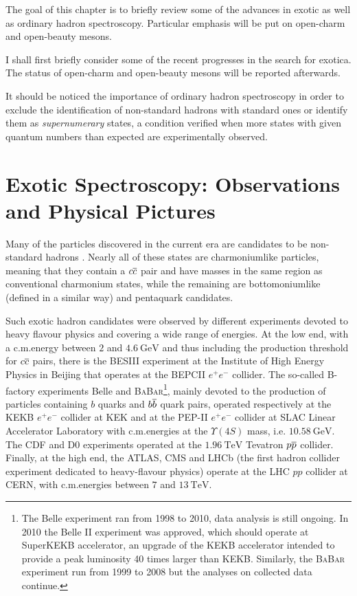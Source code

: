 The goal of this chapter is to briefly review some of the advances in exotic as well as ordinary hadron spectroscopy. Particular emphasis will be put on open-charm and open-beauty mesons.

I shall first briefly consider some of the recent progresses in the search for exotica. The status of open-charm and open-beauty mesons will be reported afterwards.

It should be noticed the importance of ordinary hadron spectroscopy in order to exclude the identification of non-standard hadrons with standard ones or identify them as \emph{supernumerary} states, a condition verified when more states with given quantum numbers than expected are experimentally observed.

\section{Exotic Spectroscopy: Observations and Physical Pictures}

Many of the particles discovered in the current era are candidates to be non-standard hadrons \cite{Lebed:2016hpi, Olsen:2017bmm}. Nearly all of these states are charmoniumlike particles, meaning that they contain a $c \overline{c}$ pair and have masses in the same region as conventional charmonium states, while the remaining are bottomoniumlike (defined in a similar way) and pentaquark candidates. 

Such exotic hadron candidates were observed by different experiments devoted to heavy flavour physics and covering a wide range of energies. At the low end, with a c.m.\@ energy between $2$ and $4.6 \ \text{GeV}$ and thus including the production threshold for $c \overline{c}$ pairs, there is the BESIII experiment at the Institute of High Energy Physics in Beijing that operates at the BEPCII $e^+ e^-$ collider. The so-called B-factory experiments Belle and \textsc{BaBar}\footnote{The Belle experiment ran from 1998 to 2010, data analysis is still ongoing. In 2010 the Belle II experiment was approved, which should operate at SuperKEKB accelerator, an upgrade of the KEKB accelerator intended to provide a peak luminosity 40 times larger than KEKB. Similarly, the \textsc{BaBar} experiment run from 1999 to 2008 but the analyses on collected data continue.}, mainly devoted to the production of particles containing $b$ quarks and $b \overline{b}$ quark pairs, operated respectively at the KEKB $e^+ e^-$ collider at KEK and at the PEP-II $e^+ e^-$ collider at SLAC Linear Accelerator Laboratory with c.m.\@ energies at the $\varUpsilon(4S)$ mass, i.e. $10.58 \ \text{GeV}$. The CDF and D0 experiments operated at the $1.96 \ \text{TeV}$ Tevatron $p \overline{p}$ collider. Finally, at the high end, the ATLAS, CMS and LHCb (the first hadron collider experiment dedicated to heavy-flavour physics) operate at the LHC $p p$ collider at CERN, with c.m.\@ energies between $7$ and $13 \ \text{TeV}$. 

